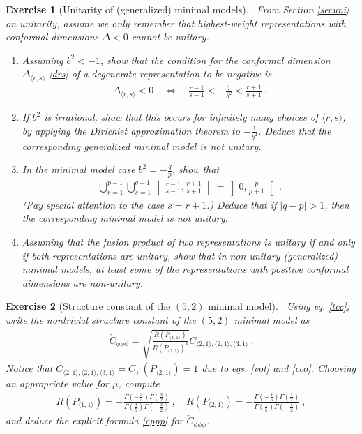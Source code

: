 \documentclass[12pt, a4paper, notitlepage, twoside]{report}
\numberwithin{equation}{section}
\theoremstyle{break}
\newtheorem{exo}{Exercise}[chapter]
\begin{document}
\begin{exo}[Unitarity of (generalized) minimal models]
 ~\label{exoneg}
From Section \ref{secuni} on unitarity, assume we only remember that highest-weight representations with conformal dimensions $\Delta <0$ cannot be unitary. 
\begin{enumerate}
 \item 
Assuming $b^2 < -1$, show that the condition for the conformal dimension $\Delta_{\langle r,s \rangle}$ \eqref{drs} of a degenerate representation to be negative is 
\begin{align}
 \Delta_{\langle r,s \rangle} < 0 \quad \iff \quad \frac{r-1}{s-1} < -\frac{1}{b^2} < \frac{r+1}{s+1} \ .
\end{align}
\item
If $b^2$ is irrational, show that this occurs for infinitely many choices of $\langle r,s \rangle$, by applying the Dirichlet approximation theorem to $-\frac{1}{b^2}$. 
Deduce that the corresponding generalized minimal model is not unitary. 
\item
In the minimal model case $b^2 = -\frac{q}{p}$, show that 
\begin{align}
 \bigcup_{r=1}^{p-1}\bigcup_{s=1}^{q-1} \left] \frac{r-1}{s-1} , \frac{r+1}{s+1} \right[  = \left]0, \frac{p}{p+1}\right[ \ .
\end{align}
(Pay special attention to the case $s=r+1$.) Deduce that if $|q-p|>1$, then the corresponding minimal model is not unitary.
\item
Assuming that the fusion product of two representations is unitary if and only if both representations are unitary, show that in non-unitary (generalized) minimal models, at least some of the representations with positive conformal dimensions are non-unitary.
\end{enumerate}
\end{exo}

\begin{exo}[Structure constant of the $(5,2)$ minimal model]
 ~\label{exocppp}
Using eq. \eqref{tcc}, write the nontrivial structure constant of the $(5,2)$ minimal model as 
\begin{align}
 \check{C}_{\phi\phi\phi} = \sqrt{\frac{R(P_{\langle 1,1 \rangle})}{R(P_{\langle 2,1 \rangle})^3}} C_{\langle 2,1\rangle , \langle 2,1 \rangle,\langle 3,1 \rangle}\ .
\end{align}
Notice that $C_{\langle 2,1\rangle , \langle 2,1 \rangle,\langle 3,1 \rangle} = C_+(P_{\langle 2,1 \rangle})=1$ due to eqs. \eqref{vot} and \eqref{cco}.
Choosing an appropriate value for $\mu$, compute
\begin{align}
 R(P_{\langle 1,1 \rangle}) = -\frac{\Gamma(-\frac35)\Gamma(\frac32)}{\Gamma(\frac35)\Gamma(-\frac32)} \ , \quad R(P_{\langle 2,1 \rangle}) = -\frac{\Gamma(-\frac15)\Gamma(\frac12)}{\Gamma(\frac15)\Gamma(-\frac12)}\ , 
\end{align}
and deduce the explicit formula \eqref{cppp} for $\check{C}_{\phi\phi\phi}$.
\end{exo}
\end{document}
